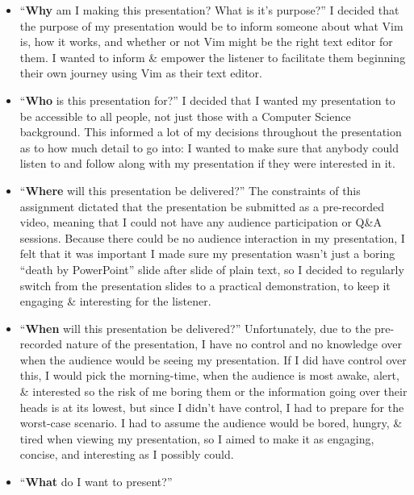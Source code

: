 \documentclass[a4paper]{article}
\begin{document}
\begin{itemize}
    \item   ``\textbf{Why} am I making this presentation? What is it's purpose?''
            I decided that the purpose of my presentation would be to inform someone about what Vim is, how it works,
            and whether or not Vim might be the right text editor for them.
            I wanted to inform \& empower the listener to facilitate them beginning their own journey using Vim as their
            text editor.
    \item   ``\textbf{Who} is this presentation for?''
            I decided that I wanted my presentation to be accessible to all people, not just those with a Computer
            Science background. 
            This informed a lot of my decisions throughout the presentation as to how much detail to go into: I wanted
            to make sure that anybody could listen to and follow along with my presentation if they were interested in
            it.
    \item   ``\textbf{Where} will this presentation be delivered?''
            The constraints of this assignment dictated that the presentation be submitted as a pre-recorded video,
            meaning that I could not have any audience participation or Q\&A sessions.
            Because there could be no audience interaction in my presentation, I felt that it was important I made sure
            my presentation wasn't just a boring ``death by PowerPoint'' slide after slide of plain text, so I decided
            to regularly switch from the presentation slides to a practical demonstration, to keep it engaging \&
            interesting for the listener.
    \item   ``\textbf{When} will this presentation be delivered?'' 
            Unfortunately, due to the pre-recorded nature of the presentation, I have no control and no knowledge over
            when the audience would be seeing my presentation.
            If I did have control over this, I would pick the morning-time, when the audience is most awake, alert, \&
            interested so the risk of me boring them or the information going over their heads is at its lowest, but
            since I didn't have control, I had to prepare for the worst-case scenario.
            I had to assume the audience would be bored, hungry, \& tired when viewing my presentation, so I aimed to
            make it as engaging, concise, and interesting as I possibly could.
    \item   ``\textbf{What} do I want to present?''

\end{itemize}
\end{document}
